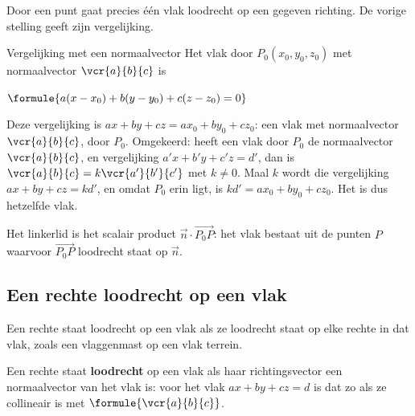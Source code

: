 Door een punt gaat precies één vlak loodrecht op een gegeven richting. De vorige stelling geeft zijn vergelijking.

\begin{theorie}
\begin{stelling}{Vergelijking met een normaalvector}
Het vlak door $P_0(x_0, y_0, z_0)$ met normaalvector $\vcr{a}{b}{c}$ is

\vspace{1mm}
\qquad $\formule{a(x - x_0) + b(y - y_0) + c(z - z_0) = 0}$
\end{stelling}
\begin{bewijs}
Deze vergelijking is $ax + by + cz = ax_0 + by_0 + cz_0$: een vlak met normaalvector $\vcr{a}{b}{c}$, door $P_0$. Omgekeerd: heeft een vlak door $P_0$ de normaalvector $\vcr{a}{b}{c}$, en vergelijking $a'x + b'y + c'z = d'$, dan is $\vcr{a}{b}{c} = k\vcr{a'}{b'}{c'}$ met $k \neq 0$. Maal $k$ wordt die vergelijking $ax + by + cz = kd'$, en omdat $P_0$ erin ligt, is $kd' = ax_0 + by_0 + cz_0$. Het is dus hetzelfde vlak.
\end{bewijs}
\end{theorie}

Het linkerlid is het scalair product $\vec n \cdot \overrightarrow{P_0P}$: het vlak bestaat uit de punten $P$ waarvoor $\overrightarrow{P_0P}$ loodrecht staat op $\vec n$.


\begin{oefeningen}
\end{oefeningen}

\subsection{Een rechte loodrecht op een vlak}

Een rechte staat loodrecht op een vlak als ze loodrecht staat op elke rechte in dat vlak, zoals een vlaggenmast op een vlak terrein.

\begin{theorie}
Een rechte staat \textbf{\textcolor{accent}{loodrecht}} op een vlak als haar richtingsvector een normaalvector van het vlak is: voor het vlak $ax + by + cz = d$ is dat zo als ze collineair is met $\formule{\vcr{a}{b}{c}}$.
\end{theorie}

